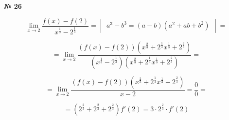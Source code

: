 \documentclass{article}
\begin{document}
\textbf{№ 26} 

\begingroup
\Large

$$ \lim\limits_{x\to 2} \frac{f(x) - f(2)}{x^{\frac{1}{3}} - 2^{\frac{1}{3}}}
= \begin{vmatrix}
a^3 - b^3 = (a-b)(a^2 + ab + b^2)
\end{vmatrix}
= $$

$$ = \lim\limits_{x\to 2} \frac{(f(x) - f(2)) (x^{\frac{2}{3}} + 2^{\frac{1}{3}} x^{\frac{1}{3}} + 2^{\frac{2}{3}})} {(x^{\frac{1}{3}} - 2^{\frac{1}{3}}) (x^{\frac{2}{3}} + 2^{\frac{1}{3}} x^{\frac{1}{3}} + 2^{\frac{2}{3}})} 
= $$

$$ = \lim\limits_{x\to 2} \frac{(f(x) - f(2)) (x^{\frac{2}{3}} + 2^{\frac{1}{3}} x^{\frac{1}{3}} + 2^{\frac{2}{3}})} {x-2}
= \frac{0}{0}
= $$

$$ = \left( 2^{\frac{2}{3}} + 2^{\frac{2}{3}} + 2^{\frac{2}{3}} \right) f'(2)
= 3 \cdot 2^{\frac{2}{3}} \cdot f'(2)$$

\endgroup
\end{document}
